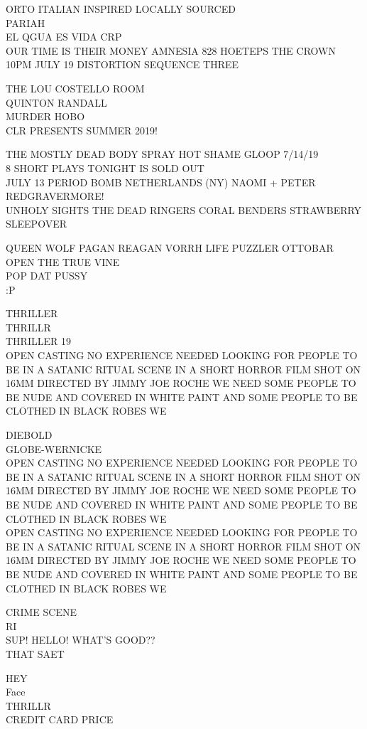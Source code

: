 \documentclass[10pt,letterpaper]{article}
\begin{document}
ORTO ITALIAN INSPIRED LOCALLY SOURCED\\
PARIAH\\
EL QGUA ES VIDA CRP\\
OUR TIME IS THEIR MONEY AMNESIA 828 HOETEPS THE CROWN 10PM JULY 19 DISTORTION SEQUENCE THREE

THE LOU COSTELLO ROOM\\
QUINTON RANDALL\\
MURDER HOBO\\
CLR PRESENTS SUMMER 2019!

THE MOSTLY DEAD BODY SPRAY HOT SHAME GLOOP 7/14/19\\
8 SHORT PLAYS TONIGHT IS SOLD OUT\\
JULY 13 PERIOD BOMB NETHERLANDS (NY) NAOMI + PETER REDGRAVERMORE!\\
UNHOLY SIGHTS THE DEAD RINGERS CORAL BENDERS STRAWBERRY SLEEPOVER

QUEEN WOLF PAGAN REAGAN VORRH LIFE PUZZLER OTTOBAR\\
OPEN THE TRUE VINE\\
POP DAT PUSSY\\
:P

THRILLER\\
THRILLR\\
THRILLER 19\\
OPEN CASTING NO EXPERIENCE NEEDED LOOKING FOR PEOPLE TO BE IN A SATANIC RITUAL SCENE IN A SHORT HORROR FILM SHOT ON 16MM DIRECTED BY JIMMY JOE ROCHE WE NEED SOME PEOPLE TO BE NUDE AND COVERED IN WHITE PAINT AND SOME PEOPLE TO BE CLOTHED IN BLACK ROBES WE

DIEBOLD\\
GLOBE{-}WERNICKE\\
OPEN CASTING NO EXPERIENCE NEEDED LOOKING FOR PEOPLE TO BE IN A SATANIC RITUAL SCENE IN A SHORT HORROR FILM SHOT ON 16MM DIRECTED BY JIMMY JOE ROCHE WE NEED SOME PEOPLE TO BE NUDE AND COVERED IN WHITE PAINT AND SOME PEOPLE TO BE CLOTHED IN BLACK ROBES WE\\
OPEN CASTING NO EXPERIENCE NEEDED LOOKING FOR PEOPLE TO BE IN A SATANIC RITUAL SCENE IN A SHORT HORROR FILM SHOT ON 16MM DIRECTED BY JIMMY JOE ROCHE WE NEED SOME PEOPLE TO BE NUDE AND COVERED IN WHITE PAINT AND SOME PEOPLE TO BE CLOTHED IN BLACK ROBES WE

CRIME SCENE\\
RI\\
SUP! HELLO!  WHAT'S GOOD??\\
THAT SAET

HEY\\
Face\\
THRILLR\\
CREDIT CARD PRICE
\end{document}
